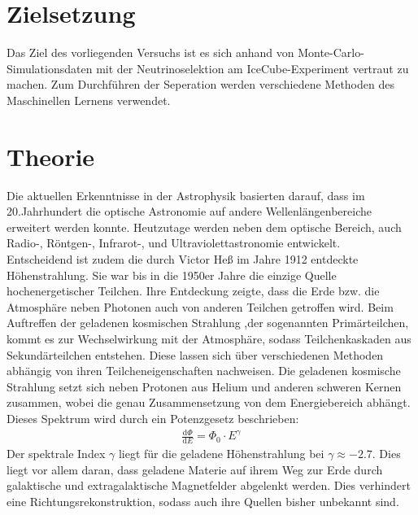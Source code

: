 \section{Zielsetzung}
Das Ziel des vorliegenden Versuchs ist es sich anhand von Monte-Carlo-Simulationsdaten mit der Neutrinoselektion am IceCube-Experiment vertraut zu machen. Zum Durchführen der Seperation werden verschiedene Methoden des Maschinellen Lernens verwendet.
\section{Theorie}
Die aktuellen Erkenntnisse in der Astrophysik basierten darauf, dass im 20.Jahrhundert die optische Astronomie auf andere Wellenlängenbereiche erweitert werden konnte. Heutzutage werden neben dem optische Bereich, auch Radio-, Röntgen-, Infrarot-, und Ultraviolettastronomie entwickelt.\\
Entscheidend ist zudem die durch Victor Heß im Jahre 1912 entdeckte Höhenstrahlung. Sie war bis in die 1950er Jahre die einzige Quelle hochenergetischer Teilchen. Ihre Entdeckung zeigte, dass die Erde bzw. die Atmosphäre neben Photonen auch von anderen Teilchen getroffen wird. Beim Auftreffen der geladenen kosmischen Strahlung ,der sogenannten Primärteilchen, kommt es zur Wechselwirkung mit der Atmosphäre, sodass Teilchenkaskaden aus Sekundärteilchen entstehen. Diese lassen sich über verschiedenen Methoden abhängig von ihren Teilcheneigenschaften nachweisen. Die geladenen kosmische Strahlung setzt sich neben Protonen aus Helium und anderen schweren Kernen zusammen, wobei die genau Zusammensetzung von dem Energiebereich abhängt. Dieses Spektrum wird durch ein Potenzgesetz beschrieben:
\begin{align}
	\frac{\text{d}\Phi}{\text{d}E} = \Phi_{0} \cdot E^{\gamma}
\end{align}
Der spektrale Index $\gamma$ liegt für die geladene Höhenstrahlung bei $\gamma \approx -2.7$. Dies liegt vor allem daran, dass geladene Materie auf ihrem Weg zur Erde durch galaktische und extragalaktische Magnetfelder abgelenkt werden. Dies verhindert eine Richtungsrekonstruktion, sodass auch ihre Quellen bisher unbekannt sind.
